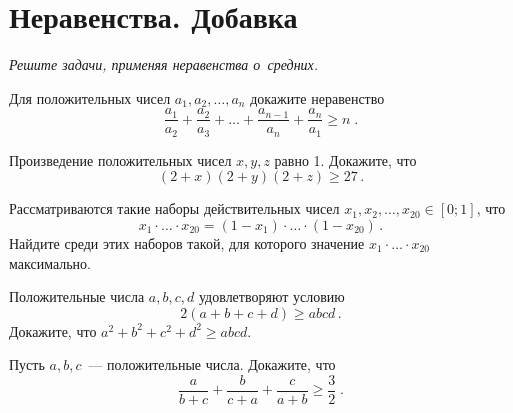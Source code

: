 
\section*{Неравенства. Добавка}





\vspace{-1ex}
\emph{Решите задачи, применяя неравенства о~средних.}
\vspace{1ex}

\begin{problems}


\item
Для положительных чисел $a_1, a_2, \ldots, a_n$ докажите неравенство
\[
    \frac{a_1}{a_2} + \frac{a_2}{a_3}
    + \ldots +
    \frac{a_{n-1}}{a_n} + \frac{a_n}{a_1}
\geq
    n
\;.\]

\item
Произведение положительных чисел $x, y, z$ равно 1.
Докажите, что
\[
    (2 + x) (2 + y) (2 + z) \geq 27
\,.\]

\item
Рассматриваются такие наборы действительных чисел
$x_1, x_2, \ldots, x_{20} \in [0; 1]$,
что
\[
    x_1 \cdot \ldots \cdot x_{20}
=
    (1 - x_1) \cdot \ldots \cdot (1 - x_{20})
\,.\]
Найдите среди этих наборов такой, для которого значение
$x_1 \cdot \ldots \cdot x_{20}$ максимально.

\item
Положительные числа $a, b, c, d$ удовлетворяют условию\enspace
\[
    2 (a + b + c + d) \geq abcd
\,.\]
Докажите, что\enspace
$a^2 + b^2 + c^2 + d^2 \geq abcd$.

\item
Пусть $a, b, c$~--- положительные числа.
Докажите, что
\[
    \frac{a}{b + c} + \frac{b}{c + a} + \frac{c}{a + b}
\geq
    \frac{3}{2}
\;.\]

\end{problems}

